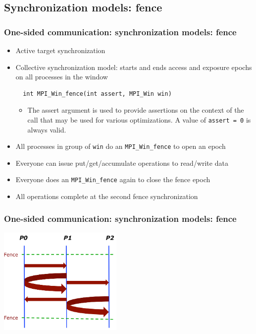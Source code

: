 \documentclass{beamer}
\begin{document}
\subsection{Synchronization models: fence}
\begin{frame}[fragile]
  \frametitle{One-sided communication: synchronization models: fence }
  \begin{itemize}
  \item Active target synchronization
  \item Collective synchronization model: starts and ends access and exposure epochs on all processes in the window
{\color{mycolorcode}
\begin{verbatim}
  int MPI_Win_fence(int assert, MPI_Win win)
\end{verbatim}
}
    \begin{itemize}
    \item The assert argument is used to provide assertions on the context of the call that may
      be used for various optimizations. A value of {\color{mycolorcode}\verb|assert = 0|} is always valid.
    \end{itemize}
  \item All processes in group of {\color{mycolorcode}\verb|win|} do an {\color{mycolorcode}\verb|MPI_Win_fence|} to open an epoch
  \item Everyone can issue put/get/accumulate operations to read/write data
  \item Everyone does an {\color{mycolorcode}\verb|MPI_Win_fence|} again to close the fence epoch
  \item All operations complete at the second fence synchronization
\end{itemize}
\end{frame}

\begin{frame}[fragile]
  \frametitle{One-sided communication: synchronization models: fence }
\includegraphics[width=6.0cm]{graphs/fence.png}
\end{frame}
\end{document}
